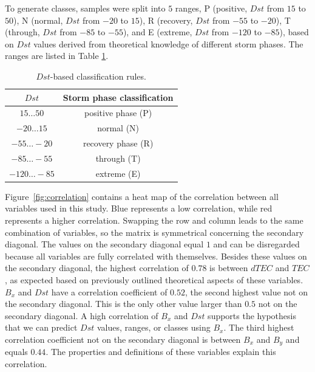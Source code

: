 \documentclass[sn-mathphys-num]{sn-jnl}%
\begin{document}
To generate classes, samples were split into $5$ ranges, P (positive, $Dst$ from $15$ to $50$), N (normal, $Dst$ from $-20$ to $15$), R (recovery, $Dst$ from $-55$ to $-20$), T (through, $Dst$ from $-85$ to $-55$), and E (extreme, $Dst$ from $-120$ to $-85$), based on $Dst$ values derived from theoretical knowledge of different storm phases. The ranges are listed in Table \ref{tab:Dstranges}.

\begin{table}[!ht]
    \centering
    \caption{$Dst$-based classification rules.}
    \label{tab:Dstranges}
    \begin{tabular}{|c|c|}
        \hline
        $Dst$ & Storm phase classification \\ \hline
        $15\dots50$ & positive phase (P) \\ \hline
        $-20\dots15$ & normal (N) \\ \hline
        $-55\dots-20$ & recovery phase (R) \\ \hline
        $-85\dots-55$ & through (T) \\ \hline
        $-120\dots-85$ & extreme (E) \\ \hline
    \end{tabular}
\end{table}

Figure~\ref{fig:correlation} contains a heat map of the correlation between all variables used in this study. Blue represents a low correlation, while red represents a higher correlation. Swapping the row and column leads to the same combination of variables, so the matrix is symmetrical concerning the secondary diagonal. The values on the secondary diagonal equal $1$ and can be disregarded because all variables are fully correlated with themselves. Besides these values on the secondary diagonal, the highest correlation of $0.78$ is between $dTEC$ and $TEC$, as expected based on previously outlined theoretical aspects of these variables. $B_{x}$ and $Dst$ have a correlation coefficient of $0.52$, the second highest value not on the secondary diagonal. This is the only other value larger than $0.5$ not on the secondary diagonal. A high correlation of $B_{x}$ and $Dst$ supports the hypothesis that we can predict $Dst$ values, ranges, or classes using $B_{x}$. The third highest correlation coefficient not on the secondary diagonal is between $B_{x}$ and $B_{y}$ and equals $0.44$. The properties and definitions of these variables explain this correlation.
\end{document}
